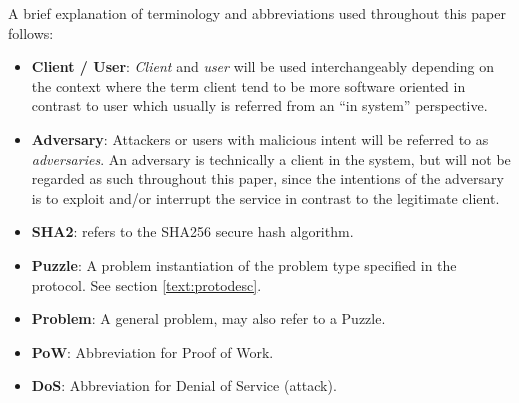 \begin{comment}
Throughout this paper attackers or users with malicious intent will be referred to as \emph{adversaries}.
\emph{Client} and \emph{user} will be used interchangeably depending on the context where the term client tend to be more software oriented in contrast to user which usually is referred from an ``in system'' perspective.
An adversary is technically a client in the system, but will not be regarded as such throughout this paper, since the intentions of the adversary is to exploit and/or interrupt the service in contrary to the legitimate client. 
\end{comment}
A brief explanation of terminology and abbreviations used throughout this paper follows:
\begin{itemize}
\item \textbf{Client / User}: \emph{Client} and \emph{user} will be used interchangeably depending on the context where the term client tend to be more software oriented in contrast to user which usually is referred from an ``in system'' perspective.
\item \textbf{Adversary}: Attackers or users with malicious intent will be referred to as \emph{adversaries}. An adversary is technically a client in the system, but will not be regarded as such throughout this paper, since the intentions of the adversary is to exploit and/or interrupt the service in contrast to the legitimate client. 
\item {\textbf{SHA2}}: refers to the SHA256 secure hash algorithm\cite{sha2}.
\item \textbf{Puzzle}: A problem instantiation of the problem type specified in the protocol. See section \ref{text:protodesc}.
\item \textbf{Problem}: A general problem, may also refer to a Puzzle.
\item \textbf{PoW}: Abbreviation for Proof of Work.
\item \textbf{DoS}: Abbreviation for Denial of Service (attack).
\end{itemize}